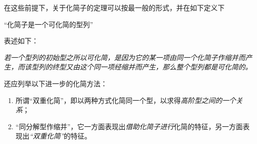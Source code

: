 \documentclass[11pt]{article}
\providecommand{\srcspaced}[1]{\emph{#1}}
\providecommand{\glqq}{“}
\providecommand{\grqq}{”}
\begin{document}
在这些前提下，关于化简子的定理可以按最一般的形式，并在如下定义下
\begin{center}
\glqq{}化简子是一个可化简的型列\grqq{}
\end{center}
表述如下：

\begin{center}
\srcspaced{若一个型列的初始型之所以可化简，是因为它的某一项由同一个化简子作缩并而产生，而该型列的终型又由这个同一项经缩并而产生，那么整个型列都是可化简的。}
\end{center}

还应列举以下进一步的化简方法：
\begin{enumerate}
\item 所谓\glqq{}双重化简\grqq{}，即以两种方式化简同一个型，以求得\srcspaced{高阶型之间的一个关系}；
\item \glqq{}同分解型作缩并\grqq{}，它一方面表现出\srcspaced{借助化简子进行}化简的特征，另一方面表现出\srcspaced{\glqq{}双重化简\grqq{}}的特征。
\end{enumerate}
\end{document}
